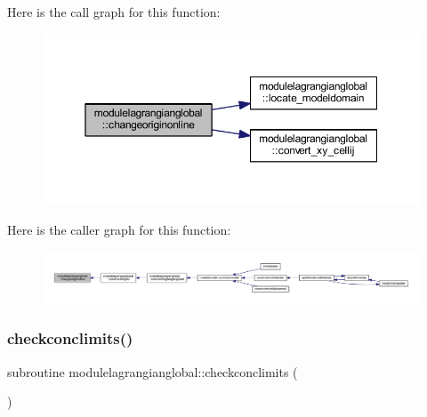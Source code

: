 Here is the call graph for this function\+:\nopagebreak
\begin{figure}[H]
\begin{center}
\leavevmode
\includegraphics[width=350pt]{namespacemodulelagrangianglobal_ac5eba799ef6e5891159d027cee26909c_cgraph}
\end{center}
\end{figure}
Here is the caller graph for this function\+:\nopagebreak
\begin{figure}[H]
\begin{center}
\leavevmode
\includegraphics[width=350pt]{namespacemodulelagrangianglobal_ac5eba799ef6e5891159d027cee26909c_icgraph}
\end{center}
\end{figure}
\mbox{\label{namespacemodulelagrangianglobal_a787d28742cbd84ad7a607a488de397e2}} 
\subsubsection{\texorpdfstring{checkconclimits()}{checkconclimits()}}
{\footnotesize\ttfamily subroutine modulelagrangianglobal\+::checkconclimits (\begin{DoxyParamCaption}{ }\end{DoxyParamCaption})\hspace{0.3cm}{\ttfamily [private]}}

